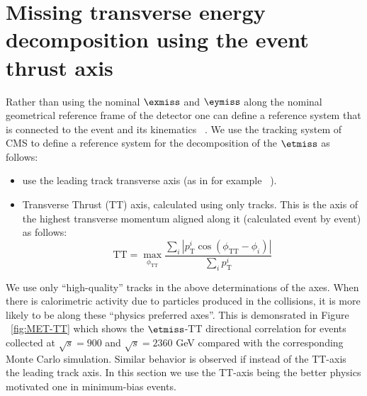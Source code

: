 
\section{Missing transverse energy decomposition using the
  event thrust axis }
Rather than using the nominal $\exmiss$ and $\eymiss$ along the nominal
geometrical reference frame of the detector one can define a reference
system that is connected to the event and its kinematics ~\cite{CMS:AN-2009-025}.  We use the
tracking system of CMS to define a reference system for the
decomposition of the $\etmiss$ as follows:

\begin{itemize}
\item use the leading track transverse axis (as in for example ~\cite{CMS:PAS-EWK-008-06}).
\item Transverse Thrust (TT) axis, calculated using only tracks. This
  is the axis of the  highest transverse momentum aligned along it
  (calculated event by event) as follows:
  \begin{equation}
    \mathrm{TT} = \max_{\phi_\mathrm{TT}}\frac{\sum_{i}|p_\text{T}^{i}\cos(\phi_\mathrm{TT}-\phi_{i})|}{\sum_{i}p_\text{T}^{i}}
  \end{equation}
\end{itemize}

We use only ``high-quality'' tracks in the above determinations of the
axes. When there is calorimetric activity due to particles produced in
the collisions, it is more likely to be along these ``physics
preferred axes''. This is demonsrated in Figure ~\ref{fig:MET-TT}
which shows the $\etmiss$-TT directional correlation for events collected at
$\sqrt{s}=900$ and $\sqrt{s}=2360$ GeV compared with the corresponding
Monte Carlo simulation.  Similar behavior is observed if instead of the
TT-axis the leading track axis. In this section we use the TT-axis
being the better physics motivated one in minimum-bias events.

